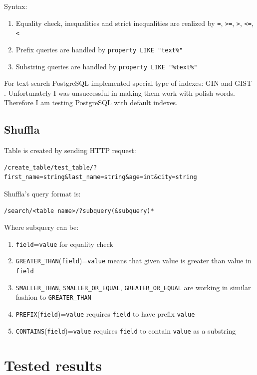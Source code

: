 \documentclass[10pt,a4paper]{article}
\begin{document}
Syntax:
\begin{enumerate}
\item Equality check, inequalities and strict inequalities are realized by \verb|=|, \verb|>=|, \verb|>|, \verb|<=|, \verb|<|
\item Prefix queries are handled by \verb|property LIKE "text%"|
\item Substring queries are handled by \verb|property LIKE "%text%"|
\end{enumerate}

For text-search PostgreSQL implemented special type of indexes: GIN \cite{PSQLGIN} and GIST \cite{PSQLGIST}. Unfortunately I was unsuccessful in making them work with polish words. Therefore I am testing PostgreSQL with default indexes.

\subsection{Shuffla}

Table is created by sending HTTP request:
\begin{verbatim}
/create_table/test_table/?first_name=string&last_name=string&age=int&city=string
\end{verbatim}
Shuffla's query format is:

\begin{verbatim}
/search/<table name>/?subquery(&subquery)*
\end{verbatim}
Where subquery can be:
\begin{enumerate}
\item \verb|field|=\verb|value| for equality check
\item \verb|GREATER_THAN|(\verb|field|)=\verb|value| means that given value is greater than value in \verb|field| 
\item \verb|SMALLER_THAN|, \verb|SMALLER_OR_EQUAL|, \verb|GREATER_OR_EQUAL| are working in similar fashion to \verb|GREATER_THAN|
\item \verb|PREFIX|(\verb|field|)=\verb|value| requires \verb|field| to have prefix \verb|value|
\item \verb|CONTAINS|(\verb|field|)=\verb|value| requires \verb|field| to contain \verb|value| as a substring
\end{enumerate}

\section{Tested results}
\end{document}
